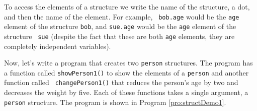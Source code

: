 To access the elements of a structure we write the name of the
structure, a dot, and then the name of the element.  For example, {\tt
  bob.age} would be the {\tt age} element of the structure {\tt bob},
and {\tt sue.age} would be the {\tt age} element of the structure {\tt
  sue} (despite the fact that these are both {\tt age} elements, they
are completely independent variables).

Now, let's write a program that creates two {\tt person} structures.
The program has a function called {\tt showPerson1()} to show the
elements of a {\tt person} and another function called {\tt
  changePerson1()} that reduces the person's age by two and decreases
the weight by five.  Each of these functions takes a single
argument, a {\tt person} structure.  The program is shown in Program
\ref{pro:structDemo1}.

